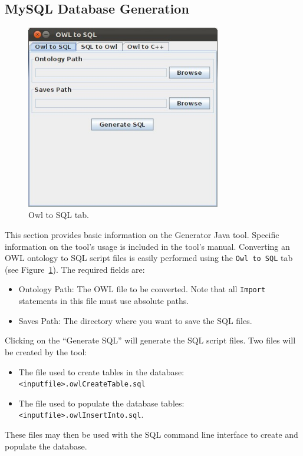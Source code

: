 \subsection{MySQL Database Generation}\label{ss:ontology2db}
\begin{figure}[h!t!]
\centering
\includegraphics[width=8.5cm]{images/OWLtoSQL001.jpeg}
\caption{Owl to SQL tab.}
\label{fig:owl2sql}
\end{figure}

This section provides basic information on the Generator Java tool. Specific information on the tool\rq{}s usage is included in the tool\rq{}s manual.
Converting an OWL ontology to SQL script files is easily performed using the \texttt{Owl to SQL} tab  (see Figure~\ref{fig:owl2sql}). The required fields are:

\begin{itemize}
 \item Ontology Path: The OWL file to be converted. Note that all \texttt{Import} statements in this file must use absolute paths.
 \item Saves Path: The directory where you want to save the SQL files.
\end{itemize}

Clicking on the ``Generate SQL'' will generate the SQL script files. Two files will be created by the tool:
\begin{itemize}
\item The file used to create tables in the database: \texttt{<inputfile>.owlCreateTable.sql} 
\item The file used to populate the database tables: \texttt{<inputfile>.owlInsertInto.sql}. 
\end{itemize}
These files may then be used with the SQL command line interface to create and populate the database.

